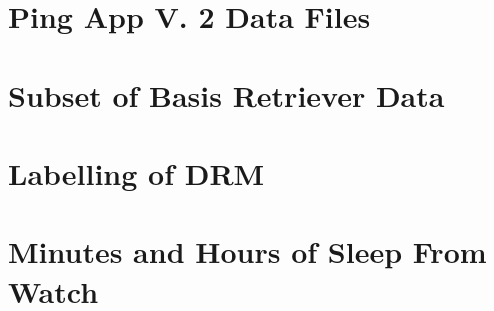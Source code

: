\documentclass[12pt]{article} %
\begin{document}
\newpage
\section{Ping App V. 2 Data Files} \label{sec:ping}
\begin{figure}[H]
 \centering 
 
\end{figure}

\newpage
\begin{figure}[H]
 \centering 
 
\end{figure}

\newpage
\begin{figure}[H]
 \centering 
 
\end{figure}

\newpage
\begin{figure}[H]
 \centering 
 
\end{figure}

\newpage
\begin{figure}[H]
 \centering 
 
\end{figure}

\newpage
\begin{figure}[H]
 \centering 
 
\end{figure}

\newpage
\section{Subset of Basis Retriever Data} \label{sec:subset}
\begin{figure}[H]
 \centering 
 
\end{figure}



\newpage
\section{Labelling of DRM} \label{sec:drm}


%

\newpage
\section{Minutes and Hours of Sleep From Watch} \label{sec:ground_truth}
\end{document}
